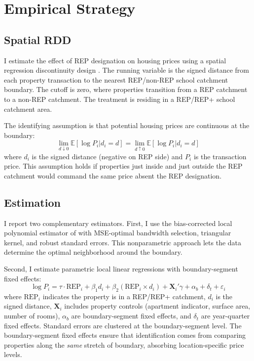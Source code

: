 \documentclass[12pt]{article}
\newcommand{\E}{\mathbb{E}}
\begin{document}



\section{Empirical Strategy}
\label{sec:strategy}

\subsection{Spatial RDD}

I estimate the effect of REP designation on housing prices using a spatial regression discontinuity design \citep{black1999, keele2015}. The running variable is the signed distance from each property transaction to the nearest REP/non-REP school catchment boundary. The cutoff is zero, where properties transition from a REP catchment to a non-REP catchment. The treatment is residing in a REP/REP+ school catchment area.

The identifying assumption is that potential housing prices are continuous at the boundary:
\begin{equation}
\lim_{d \downarrow 0} \E[\log P_i | d_i = d] = \lim_{d \uparrow 0} \E[\log P_i | d_i = d]
\end{equation}
where $d_i$ is the signed distance (negative on REP side) and $P_i$ is the transaction price. This assumption holds if properties just inside and just outside the REP catchment would command the same price absent the REP designation.

\subsection{Estimation}

I report two complementary estimators. First, I use the bias-corrected local polynomial estimator of \citet{cattaneo2020} with MSE-optimal bandwidth selection, triangular kernel, and robust standard errors. This nonparametric approach lets the data determine the optimal neighborhood around the boundary.

Second, I estimate parametric local linear regressions with boundary-segment fixed effects:
\begin{equation}
\log P_i = \tau \cdot \text{REP}_i + \beta_1 d_i + \beta_2 (\text{REP}_i \times d_i) + \mathbf{X}_i'\gamma + \alpha_b + \delta_t + \varepsilon_i
\end{equation}
where $\text{REP}_i$ indicates the property is in a REP/REP+ catchment, $d_i$ is the signed distance, $\mathbf{X}_i$ includes property controls (apartment indicator, surface area, number of rooms), $\alpha_b$ are boundary-segment fixed effects, and $\delta_t$ are year-quarter fixed effects. Standard errors are clustered at the boundary-segment level. The boundary-segment fixed effects ensure that identification comes from comparing properties along the \textit{same} stretch of boundary, absorbing location-specific price levels.
\end{document}
